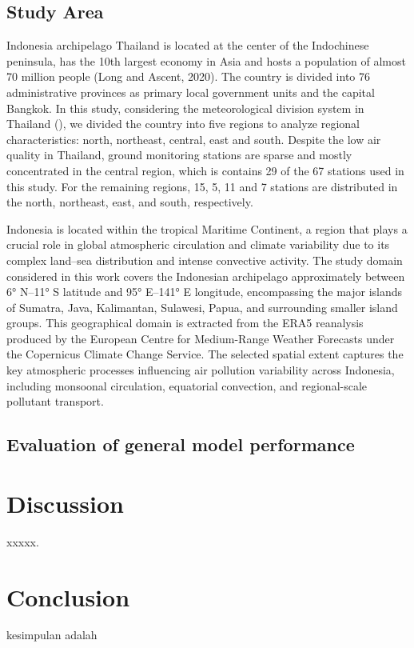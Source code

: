 \documentclass[pdflatex,sn-mathphys-num]{sn-jnl}%
\theoremstyle{thmstyleone}%
\theoremstyle{thmstyletwo}%
\theoremstyle{thmstylethree}%
\begin{document}
\subsection{Study Area}
Indonesia archipelago
Thailand is located at the center of the Indochinese peninsula, has the 10th largest economy in Asia and hosts a population of almost 70 million people (Long and Ascent, 2020). The country is divided into 76 administrative provinces as primary local government units and the capital Bangkok. In this study, considering the meteorological division system in Thailand (), we divided the country into five regions to analyze regional characteristics: north, northeast, central, east and south. Despite the low air quality in Thailand, ground monitoring stations are sparse and mostly concentrated in the central region, which is contains 29 of the 67 stations used in this study. For the remaining regions, 15, 5, 11 and 7 stations are distributed in the north, northeast, east, and south, respectively.

Indonesia is located within the tropical Maritime Continent, a region that plays a crucial role in global atmospheric circulation and climate variability due to its complex land–sea distribution and intense convective activity. The study domain considered in this work covers the Indonesian archipelago approximately between 6° N–11° S latitude and 95° E–141° E longitude, encompassing the major islands of Sumatra, Java, Kalimantan, Sulawesi, Papua, and surrounding smaller island groups. This geographical domain is extracted from the ERA5 reanalysis produced by the European Centre for Medium-Range Weather Forecasts under the Copernicus Climate Change Service. The selected spatial extent captures the key atmospheric processes influencing air pollution variability across Indonesia, including monsoonal circulation, equatorial convection, and regional-scale pollutant transport.

\subsection{Evaluation of general model performance}

\section{Discussion}\label{sec4}
xxxxx.

\section{Conclusion}\label{sec5}
kesimpulan adalah
\end{document}
